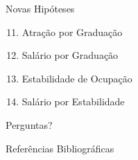 \documentclass[10pt, hyperref={pdfpagelabels=false}]{beamer}
\begin{document}
\begin{frame}[label=hipoteses-novas]{Novas Hipóteses}
  \begin{enumerate}
    \setcounter{enumi}{10}
    \item Atração por Graduação
    \item Salário por Graduação
    \item Estabilidade de Ocupação
    \item Salário por Estabilidade
  \end{enumerate}
\end{frame}

{
\begin{frame}[standout]
  Perguntas?
\end{frame}
}

\appendix

\begin{frame}[allowframebreaks]{Referências Bibliográficas}

  
  

\end{frame}
\end{document}
